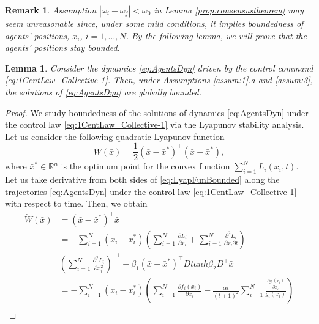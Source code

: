 \documentclass[letterpaper, 10 pt, conference]{ieeeconf}  %
\newtheorem{lemma}[theorem]{Lemma}
\newtheorem{remark}[theorem]{Remark}
\newcommand{\crb}{\color{black}}
\begin{document}
{\begin{remark}
	Assumption $\left|\omega_{i}-\omega_{j}\right|<\omega_{0}$
		in Lemma \ref{prop:consensustheorem} may seem unreasonable
		since, under some mild conditions, it implies boundedness of agents'
		positions, $x_{i}$, $i=1,\ldots,N$. By the following lemma, we will
		prove that the agents' positions stay bounded.\end{remark}
\begin{lemma}
	\label{lem:Boundedness}Consider the dynamics \eqref{eq:AgentsDyn}
	driven by the control command \eqref{eq:1CentLaw_Collective-1}. Then,
	under Assumptions \ref{assum:1}.a and \ref{assum:3}, the solutions of \eqref{eq:AgentsDyn}
	are globally bounded.\end{lemma}
\begin{proof}
	We study boundedness of the solutions of dynamics \eqref{eq:AgentsDyn}
	under the control law \eqref{eq:1CentLaw_Collective-1} via the Lyapunov
	stability analysis. Let us consider the following quadratic Lyapunov function
	\begin{equation}
	W(\bar{x})=\frac{1}{2}(\bar{x}-\bar{x}^{*})^{\top}(\bar{x}-\bar{x}^{*}),\label{eq:LyapFunBounded}
	\end{equation}
	where $\bar{x}^{*}\in\mathbb{{R}}^{n}$ is the optimum point for the
	convex function $\sum_{i=1}^{N}L_{i}(x_{i},t)$. Let us take derivative
	from both sides of \eqref{eq:LyapFunBounded} along the trajectories
	\eqref{eq:AgentsDyn} under {\crb the control law} \eqref{eq:1CentLaw_Collective-1} with
	respect to time. Then, we obtain
	\begin{align}
	\dot{W}(\bar{x}) & =(\bar{x}-\bar{x}^{*})^{\top}\dot{\bar{x}}\nonumber \\
	& =-\sum_{i=1}^{N}\left(x_{i}-x_{i}^{*}\right)\left(\sum_{i=1}^{N}\frac{\partial L_{i}}{\partial x_{i}}+\sum_{i=1}^{N}\frac{\partial^{2}L_{i}}{\partial x_{i}\partial t}\right)\nonumber \\
	& \left(\sum_{i=1}^{N}\frac{\partial^{2}L_{i}}{\partial x_{i}^{2}}\right)^{-1}-\beta_{1}(\bar{x}-\bar{x}^{*})^{\top}Dtanh\beta_{2}D^{\top}\bar{x}\nonumber \\
	& =-\sum_{i=1}^{N}\left(x_{i}-x_{i}^{*}\right)\left({\displaystyle \sum_{i=1}^{N}\frac{\partial f_{i}(x_{i})}{\partial x_{i}}}-{\displaystyle \frac{\alpha t}{\left(t+1\right)^{2}}\sum_{i=1}^{N}\frac{{\scriptstyle {\displaystyle {\displaystyle {\textstyle \frac{\partial g_{i}(x_{i})}{\partial x_{i}}}}}}}{{\textstyle {\textstyle g_{i}(x_{i})}}}}\right)\nonumber \\

\end{align}
\end{proof}}
\end{document}
